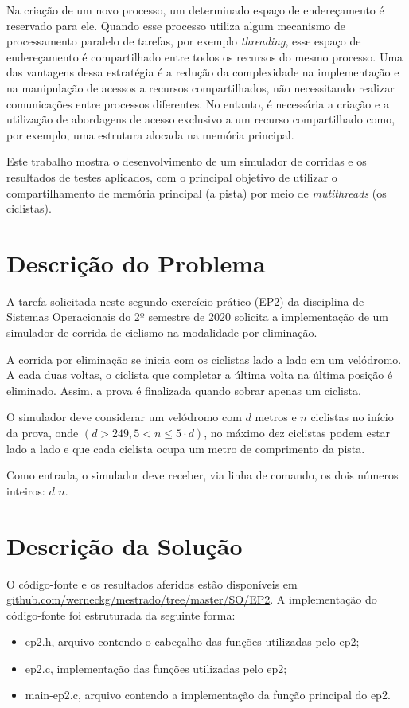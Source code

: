 \documentclass[12pt]{article}
\begin{document}
Na criação de um novo processo, um determinado espaço de endereçamento é reservado para ele. Quando esse processo utiliza algum mecanismo de processamento paralelo de tarefas, por exemplo \textit{threading}, esse espaço de endereçamento é compartilhado entre todos os recursos do mesmo processo. Uma das vantagens dessa estratégia é a redução da complexidade na implementação e na manipulação de acessos a recursos compartilhados, não necessitando realizar comunicações entre processos diferentes. No entanto, é necessária a criação e a utilização de abordagens de acesso exclusivo a um recurso compartilhado como, por exemplo, uma estrutura alocada na memória principal.

Este trabalho mostra o desenvolvimento de um simulador de corridas e os resultados de testes aplicados, com o principal objetivo de utilizar o compartilhamento de memória principal (a pista) por meio de \textit{mutithreads} (os ciclistas).

\section{Descrição do Problema} \label{sec:firstpage}

A tarefa solicitada neste segundo exercício prático (EP2) da disciplina de Sistemas Operacionais do 2º semestre de 2020 solicita a implementação de um simulador de corrida de ciclismo na modalidade por eliminação.

A corrida por eliminação se inicia com os ciclistas lado a lado em um velódromo. A cada duas voltas, o ciclista que completar a última volta na última posição é eliminado. Assim, a prova é finalizada quando sobrar apenas um ciclista.

O simulador deve considerar um velódromo com $d$ metros e $n$ ciclistas no início da prova, onde $(d>249, 5<n\leq 5\cdot d)$, no máximo dez ciclistas podem estar lado a lado e que cada ciclista ocupa um metro de comprimento da pista.

Como entrada, o simulador deve receber, via linha de comando, os dois números inteiros: $d$ $n$.

\section{Descrição da Solução}

O código-fonte e os resultados aferidos estão disponíveis em \url{github.com/werneckg/mestrado/tree/master/SO/EP2}. A implementação do código-fonte foi estruturada da seguinte forma:
\begin{itemize}
	\item ep2.h, arquivo contendo o cabeçalho das funções utilizadas pelo ep2;
	\item ep2.c, implementação das funções utilizadas pelo ep2;
	\item main-ep2.c, arquivo contendo a implementação da função principal do ep2.
\end{itemize}
\end{document}
